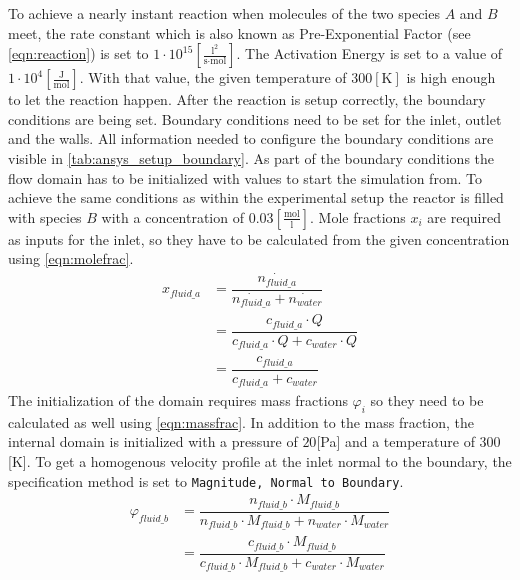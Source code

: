 \documentclass[../thesis.tex]{subfiles}
\begin{document}
To achieve a nearly instant reaction when molecules of the two species $A$ and $B$ meet, the rate constant which is also known as Pre-Exponential Factor (see \autoref{eqn:reaction}) is set to $1 \cdot 10^{15} \left[ \frac{\text{l}^2}{\text{s} \cdot \text{mol}} \right]$. The Activation Energy is set to a value of $ 1 \cdot 10^{4} \left[\frac{\text{J}}{\text{mol}}\right]$. With that value, the given temperature of $300 [\text{K}]$ is high enough to let the reaction happen.
After the reaction is setup correctly, the boundary conditions are being set. Boundary conditions need to be set for the inlet, outlet and the walls. All information needed to configure the boundary conditions are visible in \autoref{tab:ansys_setup_boundary}. As part of the boundary conditions the flow domain has to be initialized with values to start the simulation from. To achieve the same conditions as within the experimental setup the reactor is filled with species $B$ with a concentration of $0\text{.}03 \left[\frac{\text{mol}}{\text{l}}\right]$. Mole fractions $x_i$ are required as inputs for the inlet, so they have to be calculated from the given concentration using \autoref{eqn:molefrac}.
\begin{equation}
	\label{eqn:molefrac}
	\begin{split}
		x_{fluid\_a} & =\dfrac{\dot{n_{fluid\_a}}}{\dot{n_{fluid\_a}} + \dot{n_{water}}} \\[0.5em]
		& = \dfrac{c_{fluid\_a} \cdot Q}{c_{fluid\_a} \cdot Q + c_{water} \cdot Q} \\[0.5em]
		& = \dfrac{c_{fluid\_a}}{c_{fluid\_a} + c_{water}}
	\end{split}
\end{equation}
The initialization of the domain requires mass fractions $\varphi_i$ so they need to be calculated as well using \autoref{eqn:massfrac}. In addition to the mass fraction, the internal domain is initialized with a pressure of $20$[Pa] and a temperature of $300$[K]. To get a homogenous velocity profile at the inlet normal to the boundary, the specification method is set to \texttt{Magnitude, Normal to Boundary}.
\begin{equation}
	\label{eqn:massfrac}
	\begin{split}
		\varphi_{fluid\_b} & = \dfrac{n_{fluid\_b} \cdot M_{fluid\_b}}{n_{fluid\_b} \cdot M_{fluid\_b} + n_{water} \cdot M_{water}} \\[1em]
		& = \dfrac{c_{fluid\_b} \cdot M_{fluid\_b}}{c_{fluid\_b} \cdot M_{fluid\_b} + c_{water} \cdot M_{water}} \\
	\end{split}
\end{equation}
\end{document}
